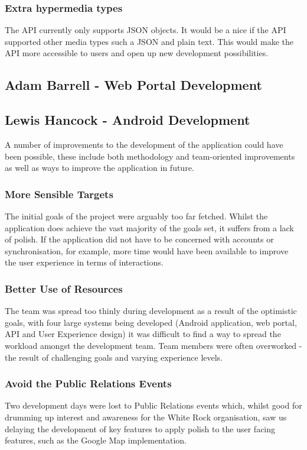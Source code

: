 \documentclass[11pt,a4paper]{report}
\begin{document}
\subsubsection{Extra hypermedia types}
The API currently only supports JSON objects. It  would be a nice if the API supported other media types such a JSON and plain text. This would make the API more accessible to users and open up new development possibilities. 

\subsection{Adam Barrell - Web Portal Development}
\subsection{Lewis Hancock - Android Development}
A number of improvements to the development of the application could have been possible, these include both methodology and team-oriented improvements as well as ways to improve the application in future.

\subsubsection{More Sensible Targets}
The initial goals of the project were arguably too far fetched. Whilst the application does achieve the vast majority of the goals set, it suffers from a lack of polish. If the application did not have to be concerned with accounts or synchronisation, for example, more time would have been available to improve the user experience in terms of interactions.

\subsubsection{Better Use of Resources}
The team was spread too thinly during development as a result of the optimistic goals, with four large systems being developed (Android application, web portal, API and User Experience design) it was difficult to find a way to spread the workload amongst the development team. Team members were often overworked - the result of challenging goals and varying experience levels.

\subsubsection{Avoid the Public Relations Events}
Two development days were lost to Public Relations events which, whilst good for drumming up interest and awareness for the White Rock organisation, saw us delaying the development of key features to apply polish to the user facing features, such as the Google Map implementation. 
\end{document}
